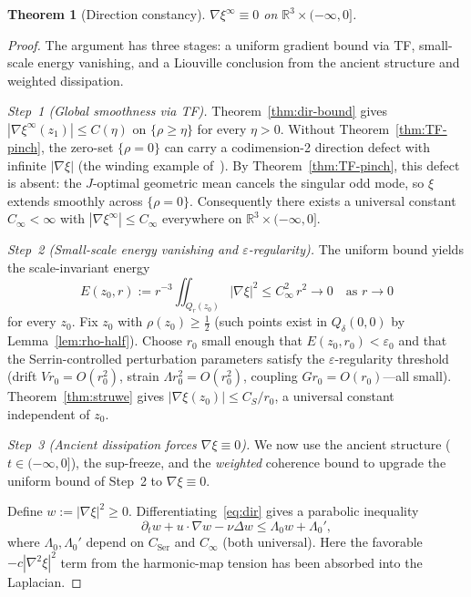 \documentclass[12pt, reqno]{amsart}
\newtheorem{theorem}{Theorem}[section]
\theoremstyle{definition}
\theoremstyle{remark}
\numberwithin{equation}{section}
\newcommand{\R}{\mathbb{R}}
\newcommand{\eps}{\varepsilon}
\newcommand{\Jc}{J}
\newcommand{\step}[1]{\par\medskip\noindent\textit{Step~#1.}\enspace}
\begin{document}
\begin{theorem}[Direction constancy]\label{thm:dir-const}
$\nabla\xi^\infty\equiv 0$ on $\R^3\times(-\infty,0]$.
\end{theorem}
\begin{proof}
The argument has three stages: a uniform gradient bound via TF,
small-scale energy vanishing, and a Liouville conclusion from the
ancient structure and weighted dissipation.

\step{1 (Global smoothness via TF)}
Theorem~\ref{thm:dir-bound} gives
$|\nabla\xi^\infty(z_1)|\le C(\eta)$ on $\{\rho\ge\eta\}$ for
every $\eta>0$.  Without Theorem~\ref{thm:TF-pinch}, the zero-set
$\{\rho=0\}$ can carry a codimension-2 direction defect with infinite
$|\nabla\xi|$ (the winding example of~\cite{CF1993}).
By Theorem~\ref{thm:TF-pinch}, this defect is absent: the
$\Jc$-optimal geometric mean cancels the singular odd mode, so
$\xi$ extends smoothly across $\{\rho=0\}$.  Consequently there
exists a universal constant $C_\infty<\infty$ with
$|\nabla\xi^\infty|\le C_\infty$ everywhere on
$\R^3\times(-\infty,0]$.

\step{2 (Small-scale energy vanishing and $\eps$-regularity)}
The uniform bound yields the scale-invariant energy
\begin{equation}\label{eq:energy-small}
E(z_0,r):=r^{-3}\iint_{Q_r(z_0)}|\nabla\xi|^2
\le C_\infty^2\,r^2\to 0
\quad\text{as }r\to 0
\end{equation}
for every $z_0$.  Fix $z_0$ with $\rho(z_0)\ge\tfrac12$ (such
points exist in $Q_\delta(0,0)$ by Lemma~\ref{lem:rho-half}).
Choose $r_0$ small enough that $E(z_0,r_0)<\eps_0$ and that the
Serrin-controlled perturbation parameters satisfy the
$\eps$-regularity threshold
(drift $Vr_0=O(r_0^2)$, strain $\Lambda r_0^2=O(r_0^2)$, coupling
$Gr_0=O(r_0)$---all small).  Theorem~\ref{thm:struwe} gives
$|\nabla\xi(z_0)|\le C_S/r_0$, a universal constant
independent of $z_0$.

\step{3 (Ancient dissipation forces $\nabla\xi\equiv 0$)}
We now use the ancient structure ($t\in(-\infty,0]$), the
sup-freeze, and the \emph{weighted} coherence bound to upgrade
the uniform bound of Step~2 to $\nabla\xi\equiv 0$.

Define $w:=|\nabla\xi|^2\ge 0$.  Differentiating~\eqref{eq:dir}
gives a parabolic inequality
\begin{equation}\label{eq:w-ineq}
\partial_t w + u\cdot\nabla w - \nu\Delta w
\le \Lambda_0 w + \Lambda_0',
\end{equation}
where $\Lambda_0,\Lambda_0'$ depend on $C_{\mathrm{Ser}}$ and
$C_\infty$ (both universal).  Here the favorable
$-c|\nabla^2\xi|^2$ term from the harmonic-map tension has been
absorbed into the Laplacian.


\end{proof}
\end{document}
